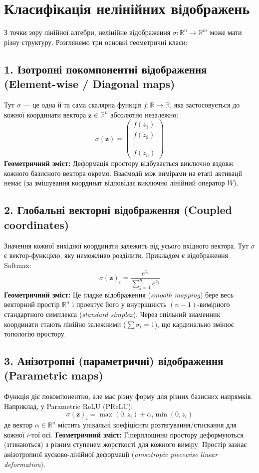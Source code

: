 \documentclass[12pt,a4paper]{article}
\begin{document}
	\section{Класифікація нелінійних відображень}
	З точки зору лінійної алгебри, нелінійне відображення $\sigma: \mathbb{R}^n \to \mathbb{R}^m$ може мати різну структуру. Розглянемо три основні геометричні класи:
	
	\subsection{1. Ізотропні покомпонентні відображення (Element-wise / Diagonal maps)}
	Тут $\sigma$ — це одна й та сама скалярна функція $f: \mathbb{R} \to \mathbb{R}$, яка застосовується до кожної координати вектора $\mathbf{z} \in \mathbb{R}^n$ абсолютно незалежно:
	$$\sigma(\mathbf{z}) = \begin{pmatrix} f(z_1) \\ f(z_2) \\ \vdots \\ f(z_n) \end{pmatrix}$$
	\textbf{Геометричний зміст:} Деформація простору відбувається виключно вздовж кожного базисного вектора окремо. Взаємодії між вимірами на етапі активації немає (за змішування координат відповідає виключно лінійний оператор $W$).
	
	\subsection{2. Глобальні векторні відображення (Coupled coordinates)}
	Значення кожної вихідної координати залежить від усього вхідного вектора. Тут $\sigma$ є вектор-функцією, яку неможливо розділити. Прикладом є відображення Softmax:
	$$\sigma(\mathbf{z})_i = \frac{e^{z_i}}{\sum_{j=1}^{n} e^{z_j}}$$
	\textbf{Геометричний зміст:} Це гладке відображення (\textit{smooth mapping}) бере весь векторний простір $\mathbb{R}^n$ і проектує його у внутрішність $(n-1)$-вимірного стандартного симплекса (\textit{standard simplex}). Через спільний знаменник координати стають лінійно залежними ($\sum \sigma_i = 1$), що кардинально змінює топологію простору.
	
	\subsection{3. Анізотропні (параметричні) відображення (Parametric maps)}
	Функція діє покомпонентно, але має різну форму для різних базисних напрямків. Наприклад, у Parametric ReLU (PReLU):
	$$\sigma(\mathbf{z})_i = \max(0, z_i) + \alpha_i \min(0, z_i)$$
	де вектор $\alpha \in \mathbb{R}^n$ містить унікальні коефіцієнти розтягування/стискання для кожної $i$-тої осі.
	\textbf{Геометричний зміст:} Гіперплощини простору деформуються (згинаються) з різним ступенем жорсткості для кожного виміру. Простір зазнає анізотропної кусково-лінійної деформації (\textit{anisotropic piecewise linear deformation}).
	
\end{document}
